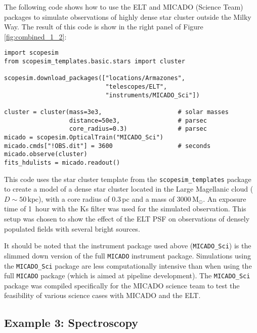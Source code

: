 The following code shows how to use the ELT and MICADO (Science Team) packages to simulate observations of highly dense star cluster outside the Milky Way.
The result of this code is show in the right panel of Figure \ref{fig:combined_1_2}:

\begin{lstlisting}[frame=single]
import scopesim
from scopesim_templates.basic.stars import cluster

scopesim.download_packages(["locations/Armazones",
                            "telescopes/ELT",
                            "instruments/MICADO_Sci"])

cluster = cluster(mass=3e3,                     # solar masses
                  distance=50e3,                # parsec
                  core_radius=0.3)              # parsec
micado = scopesim.OpticalTrain("MICADO_Sci")
micado.cmds["!OBS.dit"] = 3600                  # seconds
micado.observe(cluster)
fits_hdulists = micado.readout()
\end{lstlisting}

This code uses the star cluster template from the \lstinline{scopesim_templates} package to create a model of a dense star cluster located in the Large Magellanic cloud ($D\sim 50\,\mathrm{kpc}$), with a core radius of 0.3\,pc and a mass of $3000\,\mathrm{M_{\odot}}$.
An exposure time of 1~hour with the Ks filter was used for the simulated observation.
This setup was chosen to show the effect of the ELT PSF on observations of densely populated fields with several bright sources.

It should be noted that the instrument package used above (\lstinline{MICADO_Sci}) is the slimmed down version of the full \lstinline{MICADO} instrument package.
Simulations using the \lstinline{MICADO_Sci} package are less computationally intensive than when using the full \lstinline{MICADO} package (which is aimed at pipeline development).
The \lstinline{MICADO_Sci} package was compiled specifically for the MICADO science team to test the feasibility of various science cases with MICADO and the ELT.


\subsection{Example 3: Spectroscopy}
\label{example-3-spectroscopy}

